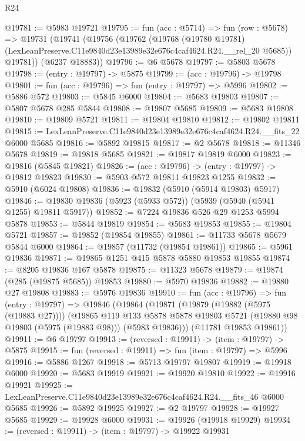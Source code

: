 \begin{lexlean}{R24}
\begin{coremodule}
@19781 := @5983 @19721
@19795 := fun (acc : @5714) =>
  fun (row : @5678) =>
  @19731
    (@19741
      (@19756
        (@19762
          (@19768
            (@19780 @19781)
            (LexLeanPreserve.C11e9840d23e13989e32e676c4caf4624.R24.__rel_20 @5685))
          @19781))
      (@6237 @18883))
@19796 := @6 @5678
@19797 := @5803 @5678
@19798 := (entry : @19797) -> @5875
@19799 := (acc : @19796) -> @19798
@19801 := fun (acc : @19796) => fun (entry : @19797) => @5996
@19802 := @5886 @572
@19803 := @5845 @6000
@19804 := @5683 @19803
@19807 := @5807 @5678 @285 @5844
@19808 := @19807 @5685
@19809 := @5683 @19808
@19810 := @19809 @5721
@19811 := @19804 @19810
@19812 := @19802 @19811
@19815 := LexLeanPreserve.C11e9840d23e13989e32e676c4caf4624.R24.__fits_22 @6000 @5685
@19816 := @5892 @19815
@19817 := @2 @5678
@19818 := @11346 @5678
@19819 := @19818 @5685
@19821 := @19817 @19819 @6000
@19823 := @19816 (@5845 @19821)
@19826 := (acc : @19796) -> (entry : @19797) -> @19812 @19823
@19830 := @5903 @572 @19811 @19823 @1255
@19832 := @5910 (@6024 @19808)
@19836 := @19832 (@5910 (@5914 @19803) @5917)
@19846 := @19830 @19836 (@5923 (@5933 @572)) (@5939 (@5940 (@5941 @1255) @19811 @5917))
@19852 := @7224 @19836 @526 @29 @1253 @5994 @5878
@19853 := @5844 @19819
@19854 := @5683 @19853
@19855 := @19804 @5721
@19857 := @19852 (@19854 @19855)
@19861 := @11733 @5678 @5679 @5844 @6000
@19864 := @19857 (@11732 (@19854 @19861))
@19865 := @5961 @19836
@19871 := @19865 @1251 @415 @5878 @5880 @19853 @19855
@19874 := @8205 @19836 @167 @5878
@19875 := @11323 @5678
@19879 := @19874 (@285 (@19875 @5685)) @19853
@19880 := @5970 @19836
@19882 := @19880 @27 @19808
@19883 := @5976 @19836
@19910 := fun (acc : @19796) =>
  fun (entry : @19797) =>
  @19846
    (@19864
      (@19871
        (@19879 (@19882 (@5975 (@19883 @27))))
        (@19865
          @119
          @133
          @5878
          @5878
          @19803
          @5721
          (@19880 @98 @19803 (@5975 (@19883 @98)))
          (@5983 @19836)))
      (@11781 @19853 @19861))
@19911 := @6 @19797
@19913 := (reversed : @19911) -> (item : @19797) -> @5875
@19915 := fun (reversed : @19911) => fun (item : @19797) => @5996
@19916 := @5886 @1267
@19918 := @5713 @19797 @19807
@19919 := @19918 @6000
@19920 := @5683 @19919
@19921 := @19920 @19810
@19922 := @19916 @19921
@19925 := LexLeanPreserve.C11e9840d23e13989e32e676c4caf4624.R24.__fits_46 @6000 @5685
@19926 := @5892 @19925
@19927 := @2 @19797
@19928 := @19927 @5685
@19929 := @19928 @6000
@19931 := @19926 (@19918 @19929)
@19934 := (reversed : @19911) -> (item : @19797) -> @19922 @19931

\end{coremodule}
\end{lexlean}
